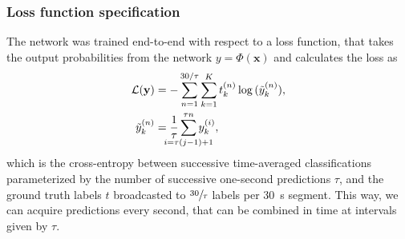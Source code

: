 \subsubsection{Loss function specification}
The network was trained end-to-end with respect to a loss function, that takes the output probabilities from the network $y = \Phi(\mathbf{x})$ and calculates the loss as
\begin{align}
\begin{split}\label{eq:loss-paperII}
    \mathcal{L} \parentheses{ \mathbf{y} } &= - \sum_{n=1}^{30/\tau}\sum_{k=1}^{K} t_k^{(n)}\log{ \parentheses{ \tilde{y}^{(n)}_k }}, \\
    \tilde{y}^{(n)}_k &= \frac{1}{\tau} \sum_{\mathclap{i=\tau \parentheses{ j - 1 } + 1}}^{\tau n} y_k^{(i)},
\end{split}
\end{align}
which is the cross-entropy between successive time-averaged classifications parameterized by the number of successive one-second predictions $\tau$, and the ground truth labels $t$ broadcasted to $\sfrac{30}{\tau}$ labels per \SI{30}{\second} segment.
This way, we can acquire predictions every second, that can be combined in time at intervals given by $\tau$.

